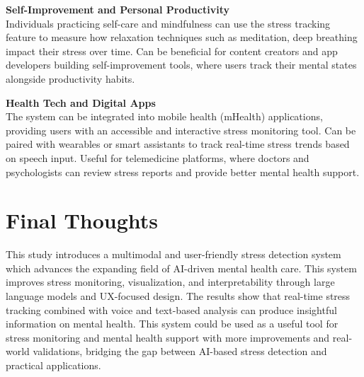 \documentclass[Arial,12pt,openright,twoside]{book}
\begin{document}
\begin{flushleft}
\textbf{Self-Improvement and Personal Productivity} \\
\justifying
Individuals practicing self-care and mindfulness can use the stress tracking feature to measure how relaxation techniques such as meditation, deep breathing impact their stress over time. Can be beneficial for content creators and app developers building self-improvement tools, where users track their mental states alongside productivity habits.
  \end{flushleft}
 \begin{flushleft}
\textbf{Health Tech and Digital Apps} \\
\justifying
The system can be integrated into mobile health (mHealth) applications, providing users with an accessible and interactive stress monitoring tool. Can be paired with wearables or smart assistants to track real-time stress trends based on speech input. Useful for telemedicine platforms, where doctors and psychologists can review stress reports and provide better mental health support.
  \end{flushleft}
  \section{Final Thoughts}
This study introduces a multimodal and user-friendly stress detection system which advances the expanding field of AI-driven mental health care. This system improves stress monitoring, visualization, and interpretability through large language models and UX-focused design. The results show that real-time stress tracking combined with voice and text-based analysis can produce insightful information on mental health. This system could be used as a useful tool for stress monitoring and mental health support with more improvements and real-world validations, bridging the gap between AI-based stress detection and practical applications.

%
\end{document}

